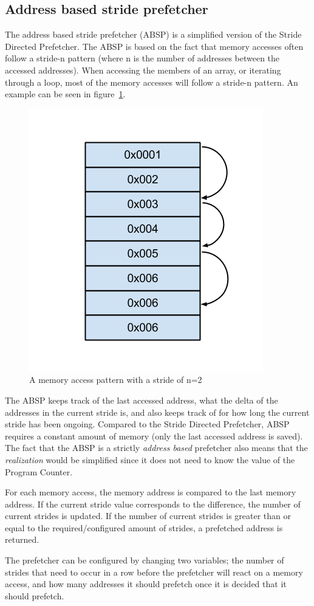 \subsection{Address based stride prefetcher}
\label{sec:stridePrefetcher}
The address based stride prefetcher (ABSP) is a simplified version of
the Stride Directed Prefetcher. The ABSP is based on the fact that
memory accesses often follow a stride-n pattern (where n is the number
of addresses between the accessed addresses). When accessing the
members of an array, or iterating through a loop, most of the memory
accesses will follow a stride-n pattern. An example can be seen in
figure~\ref{fig:stride}.

\begin{figure}[H]
\centerline{\includegraphics[scale=0.5]{./figures/stride}}
\caption{A memory access pattern with a stride of n=2}
\label{fig:stride}
\end{figure}

The ABSP keeps track of the last accessed address, what the delta of the addresses in the current stride is, and
also keeps track of for how long the current stride has been
ongoing. Compared to the Stride Directed Prefetcher, ABSP requires a constant amount of memory (only the last accessed address is saved). The fact that the ABSP is a strictly \emph{address based} prefetcher also means that the \emph{realization} would be simplified since it does not need to know the value of the Program Counter.

For each memory access, the memory address is compared to the last
memory address. If the current stride value corresponds to the
difference, the number of current strides is updated. If the number of
current strides is greater than or equal to the required/configured
amount of strides, a prefetched address is returned.  

The prefetcher can be configured by changing two variables;
the number of strides that need to occur in a row before
the prefetcher will react on a memory access, and how many addresses it should prefetch once it is decided that it should prefetch.

